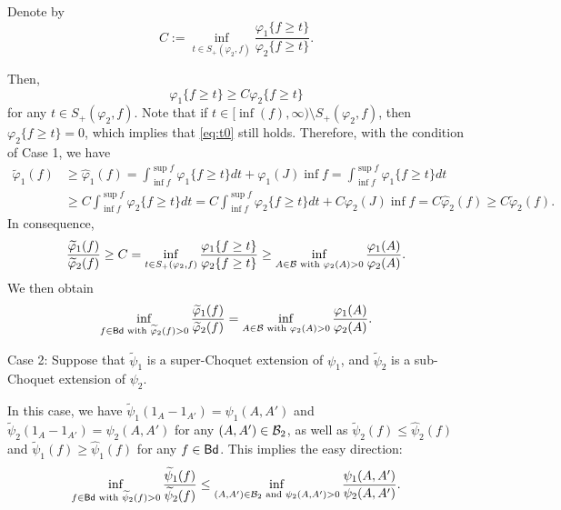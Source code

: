 \documentclass[12pt,a4paper]{article}
\begin{document}
Denote by $$C:=\inf\limits_{t\in S_+(\varphi_2,f)} \frac{\varphi_1\{f\ge t\}}{\varphi_2\{f\ge t\}}.$$

Then, \begin{equation}\label{eq:t0}\varphi_1\{f\ge t\}\ge C\varphi_2\{f\ge t\}   \end{equation} for any $t\in S_+(\varphi_2,f)$. Note that if $t\in [\inf(f),\infty)\setminus  S_+(\varphi_2,f)$, then $\varphi_2\{f\ge t\}=0$, which implies that \eqref{eq:t0} still holds. 
Therefore, with the condition %
of Case 1, we have 
\begin{align*}
\widetilde{\varphi}_1(f)&\ge\widehat{\varphi}_1(f)=\int_{\inf f}^{\sup f} \varphi_1\{f\ge t\}dt+\varphi_1(J)\inf f=\int_{\inf f}^{\sup f} \varphi_1\{f\ge t\}dt
\\&\ge C\int_{\inf f}^{\sup f} \varphi_2\{f\ge t\}dt=C\int_{\inf f}^{\sup f} \varphi_2\{f\ge t\}dt+C\varphi_2(J)\inf f
=C \widehat{\varphi}_2(f)\ge C \widetilde{\varphi}_2(f).
\end{align*}
In consequence, 
$$ \frac{\widetilde{\varphi}_1(f)}{\widetilde{\varphi}_2(f)}\ge C=\inf\limits_{t\in S_+(\varphi_2,f)} \frac{\varphi_1\{f\ge t\}}{\varphi_2\{f\ge t\}}\ge \inf_{A\in\mathcal{B}\text{ with }\varphi_2(A)>0}\frac{\varphi_1(A)}{\varphi_2(A)}.$$
We then obtain 
$$\inf_{f\in {\sf Bd} \text{ with }\widetilde{\varphi}_2(f)>0}\frac{\widetilde{\varphi}_1(f)}{\widetilde{\varphi}_2(f)}=\inf_{A\in\mathcal{B}\text{ with }\varphi_2(A)>0}\frac{\varphi_1(A)}{\varphi_2(A)} .   
$$
\vspace{0.1cm}

\noindent Case 2: Suppose that  $\widetilde{\psi}_1$ is a super-Choquet extension  of $\psi_1$, and $\widetilde{\psi}_2$ is a sub-Choquet extension  of $\psi_2$.

In this case, we have $\widetilde{\psi}_1(1_A-1_{A'})=\psi_1(A,A')$ and $\widetilde{\psi}_2(1_A-1_{A'})=\psi_2(A,A')$ for any $(A,A')\in\mathcal{B}_2$, as well as  $\widetilde{\psi}_2(f)\le \widehat{\psi}_2(f)$ and  $\widetilde{\psi}_1(f)\ge \widehat{\psi}_1(f)$ for any $f\in{\sf Bd}$. 
This implies the easy direction: $$\inf_{f\in {\sf Bd} \text{ with }\widetilde{\psi}_2(f)>0}\frac{\widetilde{\psi}_1(f)}{\widetilde{\psi}_2(f)}\le\inf_{(A,A')\in \mathcal{B}_2\text{ and }\psi_2(A,A')>0}\frac{\psi_1(A,A')}{\psi_2(A,A')}.$$
\end{document}
